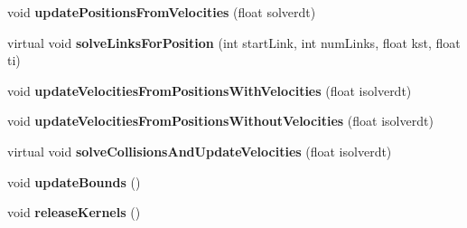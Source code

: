 \begin{DoxyCompactItemize}
\item 
\hypertarget{classbt_open_c_l_soft_body_solver_a72f132c1c1fb8646399798aa05550f1a}{void {\bfseries update\+Positions\+From\+Velocities} (float solverdt)}\label{classbt_open_c_l_soft_body_solver_a72f132c1c1fb8646399798aa05550f1a}

\item 
\hypertarget{classbt_open_c_l_soft_body_solver_a2ef8c98048547710bfc06bfd16d1c0e6}{virtual void {\bfseries solve\+Links\+For\+Position} (int start\+Link, int num\+Links, float kst, float ti)}\label{classbt_open_c_l_soft_body_solver_a2ef8c98048547710bfc06bfd16d1c0e6}

\item 
\hypertarget{classbt_open_c_l_soft_body_solver_a20ce37361e0082884415ca2c3067a31c}{void {\bfseries update\+Velocities\+From\+Positions\+With\+Velocities} (float isolverdt)}\label{classbt_open_c_l_soft_body_solver_a20ce37361e0082884415ca2c3067a31c}

\item 
\hypertarget{classbt_open_c_l_soft_body_solver_a7ec6d83da33181aefe0d1fe49fcad792}{void {\bfseries update\+Velocities\+From\+Positions\+Without\+Velocities} (float isolverdt)}\label{classbt_open_c_l_soft_body_solver_a7ec6d83da33181aefe0d1fe49fcad792}

\item 
\hypertarget{classbt_open_c_l_soft_body_solver_affca09683875b98e3f691ab05118c12a}{virtual void {\bfseries solve\+Collisions\+And\+Update\+Velocities} (float isolverdt)}\label{classbt_open_c_l_soft_body_solver_affca09683875b98e3f691ab05118c12a}

\item 
\hypertarget{classbt_open_c_l_soft_body_solver_a46f876bcacba9b8d4b08b52508c407e7}{void {\bfseries update\+Bounds} ()}\label{classbt_open_c_l_soft_body_solver_a46f876bcacba9b8d4b08b52508c407e7}

\item 
\hypertarget{classbt_open_c_l_soft_body_solver_a6f5a41ef99b636508c67e1de1083902f}{void {\bfseries release\+Kernels} ()}\label{classbt_open_c_l_soft_body_solver_a6f5a41ef99b636508c67e1de1083902f}

\end{DoxyCompactItemize}
